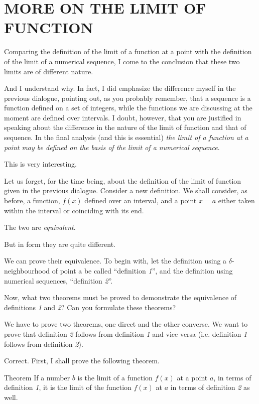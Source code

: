 
\chapter{MORE ON THE LIMIT OF FUNCTION}
\label{more-limit-func}
{\parindent=0pt
\rdr Comparing the definition of the limit of a function at a point with the definition of the limit of a numerical sequence, I come to the conclusion that these two limits are of different nature.

\athr And I understand why. In fact, I did emphasize the difference myself in the previous dialogue, pointing out, as you probably remember, that a sequence is a function defined on a set of integers, while the functions we are discussing at the moment are defined over intervals. I doubt, however, that you are justified in speaking about the difference in the nature of the limit of function and that of sequence. In the final analysis (and this is essential) \emph{the limit of a function at a point may be defined on the basis of the limit of a numerical sequence}.

\rdr This is very interesting.

\athr Let us forget, for the time being, about the definition of the limit of function given in the previous dialogue. Consider a new definition.
We shall consider, as before, a function, $f (x)$ defined over an interval, and a point $x = a$ either taken within the interval or coinciding with its end.

\athr The two are \emph{equivalent}. 

\rdr But in form they are quite different.

\athr We can prove their equivalence. To begin with, let the definition using a $\delta$-neighbourhood of point a be called ``definition \emph{1}'', and the definition using numerical sequences, ``definition \emph{2}''.

Now, what two theorems must be proved to demonstrate the equivalence of definitions \emph{1} and \emph{2}? Can you formulate these theorems?

\rdr We have to prove two theorems, one direct and the other converse. We want to prove that definition \emph{2} follows from definition \emph{1} and vice versa (i.e. definition \emph{1} follows from	definition \emph{2}).

\athr Correct. First, I shall prove the following theorem.
\begin{mytheo}{Theorem} If a number $b$ is the limit of a function $f (x)$ at a point $a$, in terms of definition \emph{1}, it is the limit of the function $f (x)$ at $a$ in terms of definition \emph{2} as well.
\end{mytheo}

}

